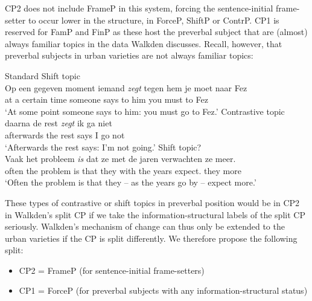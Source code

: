 \documentclass[output=paper]{langsci/langscibook}
\begin{document}
\noindent CP2 does not include FrameP in this system, forcing the
sentence-initial frame-setter to occur lower in the structure, in ForceP,
ShiftP or ContrP. CP1 is reserved for FamP and FinP as these host the preverbal
subject that are (almost) always familiar topics in the data Walkden discusses.
Recall, however, that preverbal subjects in  urban varieties are not
always familiar topics:

\ea Standard 
    \ea Shift topic\\
    \gll\label{eexsbjnpc}Op een gegeven moment iemand \textit{zegt} tegen hem je moet naar Fez\\
    at a certain time someone says to him you must to Fez\\
    \trans \enquote*{At some point someone says to him: you must go to Fez.}
    \ex Contrastive topic\\
    \gll\label{eexsbjnpd}daarna de rest \textit{zegt} ik ga niet\\
    afterwards the rest says I go not\\
    \trans \enquote*{Afterwards the rest says: I'm not going.}
    \ex Shift topic?\\
    \gll\label{eexsbjnpe}Vaak het probleem \textit{is} dat ze met de jaren verwachten ze meer.\\
    often the problem is that they with the years expect.\Pl{} they more\\
    \trans \enquote*{Often the problem is that they -- as the years go by -- expect more.}
    \z
\z

\noindent These types of contrastive or shift topics in preverbal position
would be in CP2 in Walkden's split CP if we take the information-structural
labels of the split CP seriously. Walkden's mechanism of change can thus only be
extended to the  urban varieties if the CP is split differently. We
therefore propose the following split:

\begin{itemize}

    \item CP2 = FrameP (for sentence-initial frame-setters)

    \item CP1 = ForceP (for preverbal subjects with any information-structural
        status)

\end{itemize}
\end{document}

